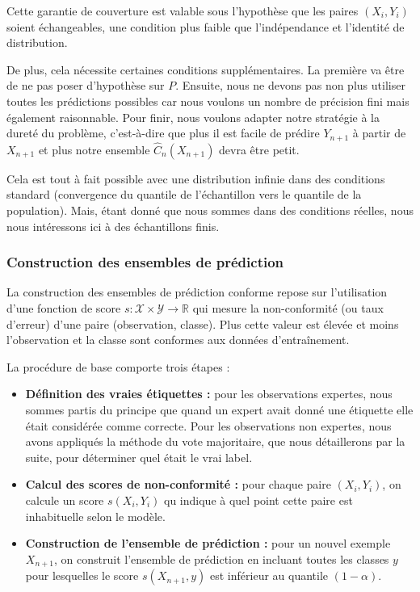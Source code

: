 \documentclass[a4paper,12pt]{article}
\begin{document}
Cette garantie de couverture est valable sous l'hypothèse que les paires $(X_i, Y_i)$ soient échangeables, une condition plus faible que l'indépendance et l'identité de distribution.

\vspace{0.2cm}

De plus, cela nécessite certaines conditions supplémentaires. La première va être de ne pas poser d'hypothèse sur $P$. Ensuite, nous ne devons pas non plus utiliser toutes les prédictions possibles car nous voulons un nombre de précision fini mais également raisonnable. Pour finir, nous voulons adapter notre stratégie à la dureté du problème, c'est-à-dire que plus il est facile de prédire $Y_{n+1}$ à partir de $X_{n+1}$ et plus notre ensemble $\hat C_n(X_{n+1})$ devra être petit.

\vspace{0.2cm}

Cela est tout à fait possible avec une distribution infinie dans des conditions standard (convergence du quantile de l'échantillon vers le quantile de la population). Mais, étant donné que nous sommes dans des conditions réelles, nous nous intéressons ici à des échantillons finis.

\subsubsection{Construction des ensembles de prédiction}

La construction des ensembles de prédiction conforme repose sur l'utilisation d'une fonction de score $s : \mathcal{X} \times \mathcal{Y} \rightarrow \mathbb{R}$ qui mesure la non-conformité (ou taux d'erreur) d'une paire (observation, classe). Plus cette valeur est élevée et moins l'observation et la classe sont conformes aux données d'entraînement.

\vspace{0.2cm}

La procédure de base comporte trois étapes : 
\begin{itemize}
    \item \textbf{Définition des vraies étiquettes :} pour les observations expertes, nous sommes partis du principe que quand un expert avait donné une étiquette elle était considérée comme correcte. Pour les observations non expertes, nous avons appliqués la méthode du vote majoritaire, que nous détaillerons par la suite, pour déterminer quel était le vrai label.
    \item \textbf{Calcul des scores de non-conformité :} pour chaque paire $(X_i, Y_i)$, on calcule un score $s(X_i, Y_i)$ qu indique à quel point cette paire est inhabituelle selon le modèle.
    \item \textbf{Construction de l'ensemble de prédiction :} pour un nouvel exemple $X_{n+1}$, on construit l'ensemble de prédiction en incluant toutes les classes $y$ pour lesquelles le score $s(X_{n+1}, y)$ est inférieur au quantile $(1- \alpha)$.
\end{itemize}
\end{document}
